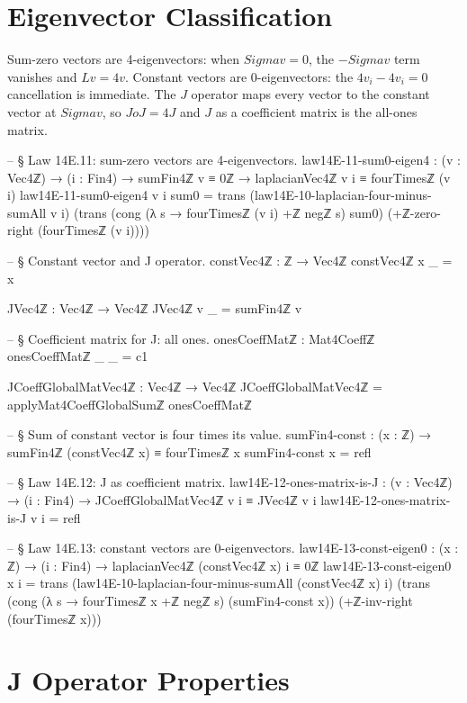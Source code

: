 \documentclass[11pt,a4paper]{book}
\def\Sigma{Sigma}%
\def\circ{o}%
\def\texorpdfstring#1#2{#2}%
\begin{document}
\section{Eigenvector Classification}

Sum-zero vectors are 4-eigenvectors: when $\Sigma v = 0$, the $-\Sigma v$ term vanishes and $Lv = 4v$.
Constant vectors are 0-eigenvectors: the $4v_i - 4v_i = 0$ cancellation is immediate.
The $J$ operator maps every vector to the constant vector at $\Sigma v$, so $J \circ J = 4J$ and $J$ as a coefficient matrix is the all-ones matrix.

\begin{code}
-- § Law 14E.11: sum-zero vectors are 4-eigenvectors.
law14E-11-sum0-eigen4 : (v : Vec4ℤ) → (i : Fin4) → sumFin4ℤ v ≡ 0ℤ →
  laplacianVec4ℤ v i ≡ fourTimesℤ (v i)
law14E-11-sum0-eigen4 v i sum0 =
  trans
    (law14E-10-laplacian-four-minus-sumAll v i)
    (trans
      (cong (λ s → fourTimesℤ (v i) +ℤ negℤ s) sum0)
      (+ℤ-zero-right (fourTimesℤ (v i))))

-- § Constant vector and J operator.
constVec4ℤ : ℤ → Vec4ℤ
constVec4ℤ x _ = x

JVec4ℤ : Vec4ℤ → Vec4ℤ
JVec4ℤ v _ = sumFin4ℤ v

-- § Coefficient matrix for J: all ones.
onesCoeffMatℤ : Mat4Coeffℤ
onesCoeffMatℤ _ _ = c1

JCoeffGlobalMatVec4ℤ : Vec4ℤ → Vec4ℤ
JCoeffGlobalMatVec4ℤ = applyMat4CoeffGlobalSumℤ onesCoeffMatℤ

-- § Sum of constant vector is four times its value.
sumFin4-const : (x : ℤ) → sumFin4ℤ (constVec4ℤ x) ≡ fourTimesℤ x
sumFin4-const x = refl

-- § Law 14E.12: J as coefficient matrix.
law14E-12-ones-matrix-is-J : (v : Vec4ℤ) → (i : Fin4) →
  JCoeffGlobalMatVec4ℤ v i ≡ JVec4ℤ v i
law14E-12-ones-matrix-is-J v i = refl

-- § Law 14E.13: constant vectors are 0-eigenvectors.
law14E-13-const-eigen0 : (x : ℤ) → (i : Fin4) →
  laplacianVec4ℤ (constVec4ℤ x) i ≡ 0ℤ
law14E-13-const-eigen0 x i =
  trans
    (law14E-10-laplacian-four-minus-sumAll (constVec4ℤ x) i)
    (trans
      (cong (λ s → fourTimesℤ x +ℤ negℤ s) (sumFin4-const x))
      (+ℤ-inv-right (fourTimesℤ x)))
\end{code}

\section{\texorpdfstring{$J$}{J} Operator Properties}
\end{document}
